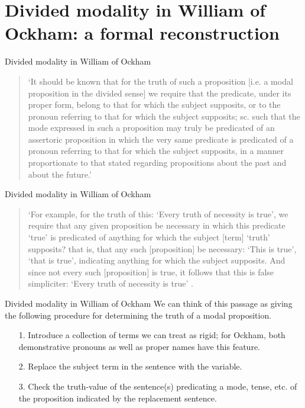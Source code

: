 \documentclass{beamer}
\begin{document}
\section{Divided modality in William of Ockham: a formal reconstruction}
\begin{frame}{Divided modality in William of Ockham}
\begin{quote}
`It should be known that for the truth of such a proposition [i.e. a modal proposition in the divided sense] we require that the predicate, under its proper form, belong to that for which the subject supposits, or to the pronoun referring to that for which the subject supposits; sc. such that the mode expressed in such a proposition may truly be predicated of an assertoric proposition in which the very same predicate is predicated of a pronoun referring to that for which the subject supposits, in a manner proportionate to that stated regarding propositions about the past and about the future.'
\end{quote}	
\end{frame}		
\begin{frame}{Divided modality in William of Ockham}
\begin{quote}
	`For example, for the truth of this: `Every truth of necessity is true', we require that any given proposition be necessary in which this predicate `true' is predicated of anything for which the subject [term] `truth' supposits? that is, that any such [proposition] be necessary:  `This is true', `that is true', indicating anything for which the subject supposits. And since not every such [proposition] is true, it follows that this is false simpliciter: `Every truth of necessity is true' \cite[II. 10, p. 249]{OckhamSL2}. 
\end{quote}
\end{frame}
\begin{frame}{Divided modality in William of Ockham}
	We can think of this passage as giving the following procedure for determining the truth of a modal proposition. \pause
	\begin{itemize}
		\item[1.] Introduce a collection of terms we can treat as rigid; for Ockham, both demonstrative pronouns as well as proper names have this feature.\pause
		\item[2.] Replace the subject term in the sentence with the variable. \pause 
		\item[3.] Check the truth-value of the sentence(s) predicating a mode, tense, etc. of the proposition indicated by the replacement sentence. 
	\end{itemize}
\end{frame}
\end{document}
